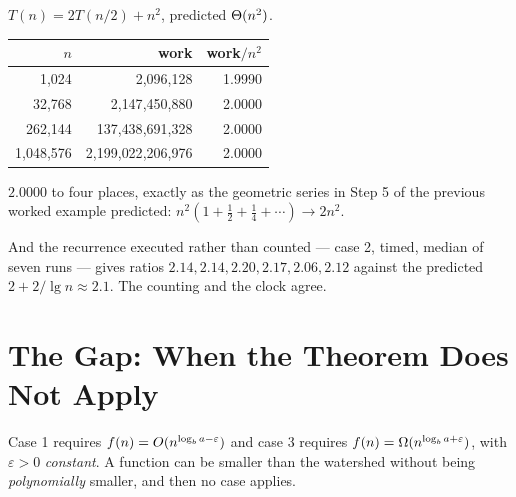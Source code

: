 \begin{worked}
$T(n) = 2T(n/2) + n^{2}$, predicted $\Theta(n^{2})$.

\begin{center}
\begin{tabular}{@{}rrr@{}}
\toprule
\rowcolor{primary!15}
$n$ & work & work$/n^{2}$ \\
\midrule
     1{,}024 &           2{,}096{,}128 & 1.9990 \\
    32{,}768 &       2{,}147{,}450{,}880 & 2.0000 \\
   262{,}144 &     137{,}438{,}691{,}328 & 2.0000 \\
1{,}048{,}576 & 2{,}199{,}022{,}206{,}976 & 2.0000 \\
\bottomrule
\end{tabular}
\end{center}

\smallskip
$2.0000$ to four places, exactly as the geometric series in Step 5 of the
previous worked example predicted: $n^{2}(1 + \tfrac12 + \tfrac14 + \cdots)
\to 2n^{2}$.

\smallskip
And the recurrence executed rather than counted --- case 2, timed, median of
seven runs --- gives ratios $2.14, 2.14, 2.20, 2.17, 2.06, 2.12$ against the
predicted $2 + 2/\lg n \approx 2.1$. The counting and the clock agree.
\end{worked}

\section{The Gap: When the Theorem Does Not Apply}

\begin{alertbox}
Case 1 requires $f(n) = O(n^{\log_{b}a - \varepsilon})$ and case 3 requires
$f(n) = \Omega(n^{\log_{b}a + \varepsilon})$, with $\varepsilon > 0$
\emph{constant}. A function can be smaller than the watershed without being
\emph{polynomially} smaller, and then no case applies.
\end{alertbox}

